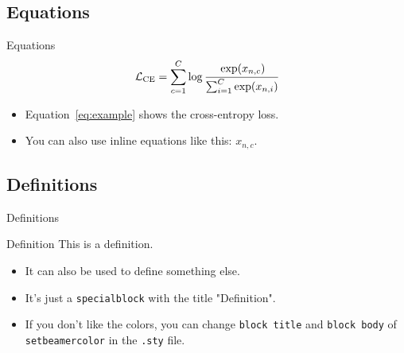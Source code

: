 \documentclass[
	10pt, %
	aspectratio=169, %
]{beamer}
\begin{document}
\subsection{Equations}
\begin{frame}{Equations}
	\begin{equation}
		\label{eq:example}
		\mathcal{L}_{\text{CE}} = \sum_{c=1}^{C} \log \cfrac{\exp(x_{n,c})}{\sum_{i=1}^{C} \exp(x_{n,i})}
	\end{equation}
	\begin{itemize}
		\item Equation~\ref{eq:example} shows the cross-entropy loss.
		\item You can also use inline equations like this: $x_{n,c}$.
	\end{itemize}
\end{frame}

\subsection{Definitions}
\begin{frame}{Definitions}
	\begin{specialblock}{Definition}
		This is a definition.
		\begin{itemize}
			\item It can also be used to define something else.
			\item It's just a \texttt{specialblock} with the title "Definition".
			\item If you don't like the colors, you can change \texttt{block title} and  \texttt{block body} of \texttt{setbeamercolor} in the \texttt{.sty} file.\end{itemize}
	\end{specialblock}
\end{frame}
\end{document}
